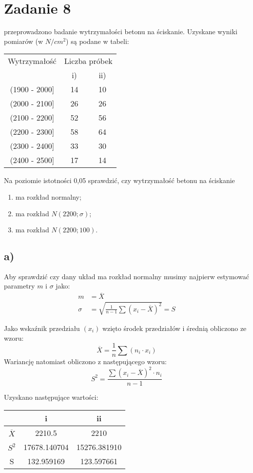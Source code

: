 \documentclass{article}
\begin{document}
\newpage
\section{Zadanie 8}
przeprowadzono badanie wytrzymałości betonu na ściskanie. Uzyskane wyniki pomiarów (w $N/{cm}^2$) są podane w tabeli:
\begin{center} \begin{tabular}{|c|c|c|} \hline
Wytrzymałość & \multicolumn{2}{c|}{Liczba próbek} \\ \cline{2-3}
& i) & ii) \\ \hline
(1900 - 2000] & 14 & 10 \\ \hline
(2000 - 2100] & 26 & 26 \\ \hline
(2100 - 2200] & 52 & 56 \\ \hline
(2200 - 2300] & 58 & 64 \\ \hline
(2300 - 2400] & 33 & 30 \\ \hline
(2400 - 2500] & 17 & 14 \\ \hline
\end{tabular} \end{center}
Na poziomie istotności 0,05 sprawdzić, czy wytrzymałość betonu na ściskanie
\begin{enumerate}[label = \alph*)]
\item ma rozkład normalny;
\item ma rozkład $N(2200; \sigma)$;
\item ma rozkład $N(2200; 100)$.
\end{enumerate} 

\subsection{a)}
Aby sprawdzić czy dany układ ma rozkład normalny musimy najpierw estymować parametry $m$ i $\sigma$ jako:
\begin{align*}
m & = \overline{X}\\
\sigma & = \sqrt{ \frac{1}{n-1} \sum(x_i - \overline{X})^2} = S
\end{align*}

Jako wskaźnik przedziału $(x_i)$ wzięto środek przedziałów i średnią obliczono ze wzoru:
\[ \overline{X} = \frac{1}{n} \sum(n_i \cdot x_i)\]
Wariancję natomiast obliczono z następującego wzoru:
\[ S^2 = \frac{\sum (x_i - \overline{X})^2 \cdot n_i}{n-1} \]

Uzyskano następujące wartości:
\begin{center} \begin{tabular}{|c|c|c|} \hline
 & i & ii \\ \hline
$\overline{X}$ & 2210.5 & 2210 \\ \hline
$S^2$ & 17678.140704 & 15276.381910 \\ \hline
S & 132.959169 & 123.597661 \\ \hline
\end{tabular} \end{center}
\end{document}
